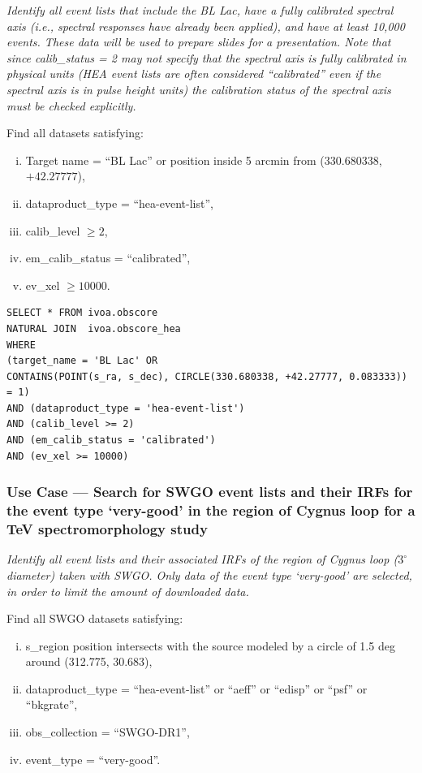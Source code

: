{\em Identify all event lists that include the BL Lac, have a fully calibrated spectral axis (i.e., spectral responses have already been applied), and have at least 10,000 events.  These data will be used to prepare slides for a presentation.  Note that since calib\_status = 2 may not specify that the spectral axis is fully calibrated in physical units (HEA event lists are often considered ``calibrated'' even if the spectral axis is in pulse height units) the calibration status of the spectral axis must be checked explicitly.\/}

\medskip
\noindent Find all datasets satisfying:
\begin{enumerate}[(i)]
  \item Target name = ``BL Lac'' or position inside 5 arcmin from (330.680338, $+42.27777$),
  \item dataproduct\_type = ``hea-event-list'',
  \item calib\_level $\geq 2$,
  \item em\_calib\_status = ``calibrated'',
  \item ev\_xel $\geq 10000$.
\end{enumerate}

\begin{verbatim}
SELECT * FROM ivoa.obscore
NATURAL JOIN  ivoa.obscore_hea
WHERE
(target_name = 'BL Lac' OR
CONTAINS(POINT(s_ra, s_dec), CIRCLE(330.680338, +42.27777, 0.083333)) = 1)
AND (dataproduct_type = 'hea-event-list')
AND (calib_level >= 2)
AND (em_calib_status = 'calibrated')
AND (ev_xel >= 10000)
\end{verbatim}


\subsubsection{Use Case ---  Search for SWGO event lists and their \glspl{IRF} for the event type `very-good' in the region of Cygnus loop for a TeV spectromorphology study}

{\em Identify all event lists and their associated \glspl{IRF} of the region of Cygnus loop ($3^{\circ}$ diameter) taken with SWGO. Only data of the event type `very-good' are selected, in order to limit the amount of downloaded data.\/}

\medskip
\noindent Find all SWGO datasets satisfying:
\begin{enumerate}[(i)]
  \item s\_region position intersects with the source modeled by a circle of 1.5 deg around (312.775, 30.683),
  \item dataproduct\_type = ``hea-event-list'' or ``aeff'' or ``edisp'' or ``psf'' or ``bkgrate'',
  \item obs\_collection = ``SWGO-DR1'',
  \item event\_type = ``very-good''.
\end{enumerate}

